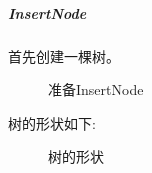 \documentclass[supercite]{Experimental_Report}
\theoremstyle{definition}
\begin{document}
\subparagraph{InsertNode}
\noindent
首先创建一棵树。
\begin{figure}[htbp]
	\centering
	\centering
	\caption{准备InsertNode}
	\label{fig5-28}
\end{figure}

\clearpage
\noindent
树的形状如下:
\begin{figure}[htbp]
	\centering
	\centering
	\caption{树的形状}
	\label{fig5-29}
\end{figure}
\end{document}
